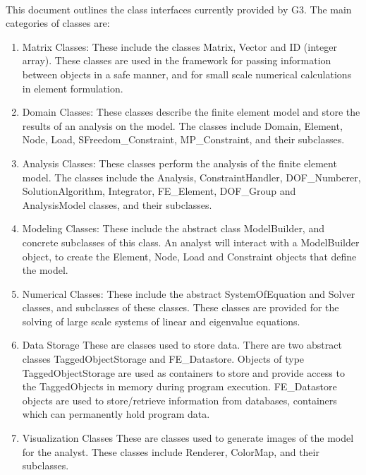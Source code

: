  \\
This document outlines the class interfaces currently provided by G3.
The main categories of classes are:
\begin{enumerate} 

\item Matrix Classes: These include the classes Matrix,
Vector and ID (integer array). These classes are used in the framework
for passing information between objects in a safe manner, and for
small scale numerical calculations in element formulation.

\item Domain Classes: These classes describe the finite element model
and store the results of an analysis on the model. The classes
include Domain, Element, Node, Load, SFreedom\_Constraint, MP\_Constraint,
and their subclasses.   

\item Analysis Classes: These classes perform the analysis of the
finite element model. The classes include the Analysis,
ConstraintHandler, DOF\_Numberer, SolutionAlgorithm, Integrator,
FE\_Element, DOF\_Group and AnalysisModel classes, and their
subclasses.  

\item Modeling Classes: These include the abstract class
ModelBuilder, and concrete subclasses of this class. An analyst will
interact with a ModelBuilder object, to create the Element, Node, Load
and Constraint objects that define the model. 

\item Numerical Classes: These include the abstract SystemOfEquation
and Solver classes, and subclasses of these classes. These classes are
provided for the solving of large scale systems of linear and eigenvalue
equations. 

\item{Data Storage} These are classes used to store data. There are
two abstract classes TaggedObjectStorage and FE\_Datastore. Objects of
type TaggedObjectStorage are used as containers to store and provide
access to the TaggedObjects in memory during program
execution. FE\_Datastore objects are used to store/retrieve
information from databases, containers which can permanently hold
program data. 

\item {Visualization Classes} These are classes used to generate images
of the model for the analyst. These classes include Renderer,
ColorMap, and their subclasses.


\end{enumerate}
